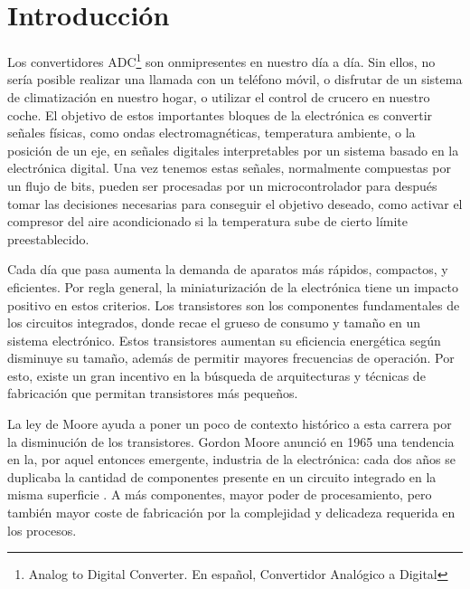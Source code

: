 \documentclass[12pt]{report} %
\begin{document}
\newpage %
\thispagestyle{empty}
\mbox{}

\clearpage
{} %

\chapter{Introducción}

	Los convertidores ADC\footnote{Analog to Digital Converter. En español, Convertidor Analógico a Digital} son onmipresentes en nuestro día a día. Sin ellos, no sería posible realizar una llamada con un teléfono móvil, o disfrutar de un sistema de climatización en nuestro hogar, o utilizar el control de crucero en nuestro coche. El objetivo de estos importantes bloques de la electrónica es convertir señales físicas, como ondas electromagnéticas, temperatura ambiente, o la posición de un eje, en señales digitales interpretables por un sistema basado en la electrónica digital. Una vez tenemos estas señales, normalmente compuestas por un flujo de bits, pueden ser procesadas por un microcontrolador para después tomar las decisiones necesarias para conseguir el objetivo deseado, como activar el compresor del aire acondicionado si la temperatura sube de cierto límite preestablecido.
	
	Cada día que pasa aumenta la demanda de aparatos más rápidos, compactos, y eficientes. Por regla general, la miniaturización de la electrónica tiene un impacto positivo en estos criterios. Los transistores son los componentes fundamentales de los circuitos integrados, donde recae el grueso de consumo y tamaño en un sistema electrónico. Estos transistores aumentan su eficiencia energética según disminuye su tamaño, además de permitir mayores frecuencias de operación. Por esto, existe un gran incentivo en la búsqueda de arquitecturas y técnicas de fabricación que permitan transistores más pequeños.
	
	La ley de Moore ayuda a poner un poco de contexto histórico a esta carrera por la disminución de los transistores. Gordon Moore anunció en 1965 una tendencia en la, por aquel entonces emergente, industria de la electrónica: cada dos años se duplicaba la cantidad de componentes presente en un circuito integrado en la misma superficie \cite{moorelaw}. A más componentes, mayor poder de procesamiento, pero también mayor coste de fabricación por la complejidad y delicadeza requerida en los procesos.
	
\end{document}
